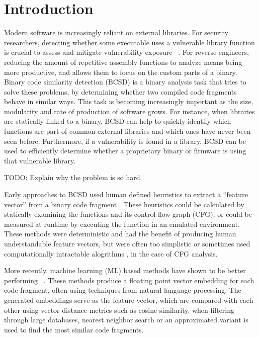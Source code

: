 \section{Introduction}

Modern software is increasingly reliant on external libraries.
For security researchers, detecting whether some executable uses a vulnerable library function is crucial to assess
and mitigate vulnerability exposure ~\cite{BCSD, BCSDsurvey}. For reverse engineers, reducing the amount of repetitive assembly functions
to analyze means being more productive, and allows them to focus on the custom parts of a binary.  Binary code similarity
detection (BCSD) is a binary analysis task that tries to solve these problems, by determining whether two compiled
code fragments behave in similar ways. This task is becoming increasingly important as the size, modularity and rate of
production of software grows. For instance, when libraries are statically linked to a binary, BCSD can help to
quickly identify which functions are part of common external libraries and which ones have never been seen before.
Furthermore, if a vulnerability is found in a library, BCSD can be used to efficiently determine whether a proprietary
binary or firmware is using that vulnerable library.

TODO: Explain why the problem is so hard.

Early approaches to BCSD used human defined heuristics to extract a ``feature vector'' from a binary code fragment \cite{op-seq, BinDiff, clones.net}.
These heuristics could be calculated by statically examining the functions and its control flow graph (CFG), or could be measured at runtime
by executing the function in an emulated environment. These methods were deterministic and had the benefit of producing
human understandable feature vectors, but were often too simplistic \cite{op-seq} or sometimes used computationally intractable alogrithms \cite{BinDiff}, in
the case of CFG analysis.

More recently, machine learning (ML) based methods have shown to be better performing ~\cite{SAFE,PalmTree,OrderMatters,Asm2Vec,CLAP}.
These methods produce a floating point vector embedding for each code fragment, often using techniques from
natural language processing. The generated embeddings serve as the feature vector, which are compared
with each other using vector distance metrics such as cosine similarity. when filtering through large databases,
nearest neighbor search or an approximated variant is used to find the most similar code fragments.

